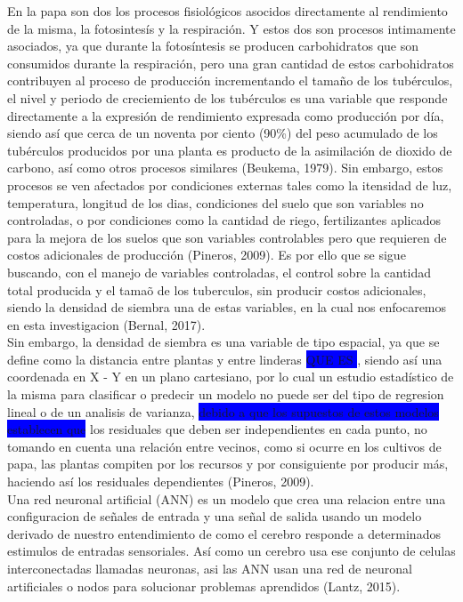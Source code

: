En la papa son dos los procesos fisiológicos asocidos directamente al rendimiento de la misma, la fotosintesís y la respiración. Y estos dos son procesos intimamente asociados, ya que durante la fotosíntesis se producen carbohidratos que son consumidos durante la respiración, pero una gran cantidad de estos carbohidratos contribuyen al proceso de producción incrementando el tama\~no de los tubérculos, el nivel y periodo de creciemiento de los tubérculos es una variable que responde directamente a la expresión de rendimiento expresada como producción por día, siendo así que cerca de un noventa por ciento (90\%) del peso acumulado de los tubérculos producidos por una planta es producto de la asimilación de dioxido de carbono, así como otros procesos similares (Beukema, 1979). Sin embargo, estos procesos se ven afectados por condiciones externas tales como la itensidad de luz, temperatura, longitud de los dias, condiciones del suelo que son variables no controladas, o por condiciones como la cantidad de riego, fertilizantes aplicados para la mejora de los suelos que son variables controlables pero que requieren de costos adicionales de producción (Pineros, 2009). Es por ello que se sigue buscando, con el manejo de variables controladas,  el control sobre la cantidad total producida y el tama\~o de los tuberculos,  sin producir costos adicionales, siendo la densidad de siembra una de estas variables, en la cual nos enfocaremos en esta investigacion (Bernal, 2017).\\

Sin embargo,  la densidad de siembra es una variable de tipo espacial, ya que se define como la distancia entre plantas y entre linderas \colorbox{blue}{QUE ES }, siendo así una coordenada en X - Y en un plano cartesiano, por lo cual un estudio estadístico de la misma para clasificar o predecir un modelo no puede ser del tipo de regresion lineal o de un analisis de varianza,  \colorbox{blue}{debido a que los supuestos de estos modelos establecen que}  los residuales que deben ser independientes en cada punto, no tomando en cuenta una relación entre vecinos,  como si ocurre en los cultivos de papa, las plantas compiten por los recursos y por consiguiente por producir más, haciendo así los residuales dependientes  (Pineros, 2009). \\

Una red neuronal artificial (ANN) es un modelo que crea una relacion entre una configuracion de señales de entrada y una señal de salida usando un modelo derivado de nuestro entendimiento de como el cerebro responde a determinados estimulos de entradas sensoriales. Así como un cerebro usa ese conjunto de celulas interconectadas llamadas neuronas, asi las ANN usan una red de neuronal artificiales o nodos para solucionar problemas aprendidos (Lantz, 2015).\\

